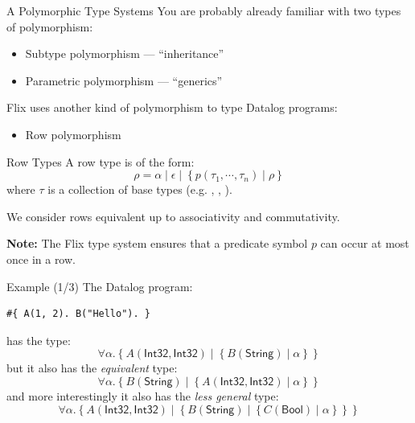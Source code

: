 \begin{frame}{A Polymorphic Type Systems}
You are probably already familiar with two types of polymorphism:

\begin{itemize}
    \item Subtype polymorphism --- ``inheritance''
    \item Parametric polymorphism --- ``generics''
\end{itemize}
    
Flix uses another kind of polymorphism to type Datalog programs:

\begin{itemize}
    \item Row polymorphism
\end{itemize}
\end{frame}

\begin{frame}[fragile]{Row Types}
A row type is of the form:
$$
\rho = \alpha \mid \epsilon \mid \left \{ p (\tau_1, \cdots, \tau_n) \mid \rho \right \}
$$
where $\tau$ is a collection of base types (e.g. , , ).

\medskip

We consider rows equivalent up to associativity and commutativity. 

\medskip

\scriptsize
\textbf{Note:} The Flix type system ensures that a predicate symbol $p$ can
occur at most once in a row.
\end{frame}

\begin{frame}[fragile]{Example (1/3)}
The Datalog program:
%
\begin{lstlisting}[language=flix, xleftmargin=0.8cm]
#{ A(1, 2). B("Hello"). }
\end{lstlisting}    
%
has the type:
%
\[
\forall \alpha. \left\{ A(\textsf{Int32}, \textsf{Int32}) \mid \left\{ B(\textsf{String}) \mid \alpha \right\} \right\}
\]
%
but it also has the \emph{equivalent} type:
%
\[
\forall \alpha. \left\{ B(\textsf{String}) \mid \left\{ A(\textsf{Int32}, \textsf{Int32}) \mid \alpha \right\} \right\}
\]
%
and more interestingly it also has the \emph{less general} type:
%
\[
\forall \alpha. \left\{ A(\textsf{Int32}, \textsf{Int32}) \mid \left\{ B(\textsf{String}) \mid \left\{ C(\textsf{Bool}) \mid \alpha \right\} \right\} \right\}
\]
%
\end{frame}

